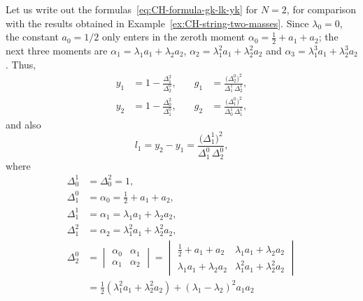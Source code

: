 \documentclass[10pt,a4paper]{article} \pdfoutput=1 
\begin{document}
\begin{example}
  \label{ex:CH-string-two-masses-cont}
  Let us write out the formulas~\eqref{eq:CH-formula-gk-lk-yk} for $N=2$,
  for comparison with the results
  obtained in Example~\ref{ex:CH-string-two-masses}.
  Since $\lambda_0=0$, the constant $a_0=1/2$ only enters in the zeroth moment
  $\alpha_0 = \tfrac12 + a_1 + a_2$;
  the next three moments are
  $\alpha_1 = \lambda_1 a_1 + \lambda_2 a_2$,
  $\alpha_2 = \lambda_1^2 a_1 + \lambda_2^2 a_2$
  and
  $\alpha_3 = \lambda_1^3 a_1 + \lambda_2^3 a_2$.
  Thus,
  \begin{equation}
    \begin{aligned}
      y_1 &= 1 - \frac{\Delta_{1}^2}{\Delta_{2}^0}
      ,\quad &
      g_1 &= \frac{\bigl( \Delta_{2}^0 \bigr)^2}{\Delta_{1}^1 \, \Delta_{2}^1}
      ,\\
      y_2 &= 1 - \frac{\Delta_{0}^2}{\Delta_{1}^0}
      ,&
      g_2 &= \frac{\bigl( \Delta_{1}^0 \bigr)^2}{\Delta_{0}^1 \, \Delta_{1}^1}
      ,
    \end{aligned}
  \end{equation}
  and also
  \begin{equation}
    l_1 = y_2 - y_1
    = \frac{\bigl( \Delta_{1}^1 \bigr)^2}{\Delta_{1}^0 \, \Delta_{2}^0}
    ,
  \end{equation}
  where
  \begin{equation}
    \label{eq:CH-string-two-masses-determinants}
    \begin{aligned}
      \Delta_0^1 &= \Delta_0^2 = 1
      ,\\
      \Delta_1^0 & = \alpha_0 = \tfrac12 + a_1 + a_2
      ,\\
      \Delta_1^1 & = \alpha_1 = \lambda_1 a_1 + \lambda_2 a_2
      ,\\
      \Delta_1^2 & = \alpha_2 = \lambda_1^2 a_1 + \lambda_2^2 a_2
      ,\\
      \Delta_2^0 & =
      \begin{vmatrix} \alpha_0 & \alpha_1 \\ \alpha_1 & \alpha_2 \end{vmatrix}
      = \begin{vmatrix}
        \tfrac12 + a_1 + a_2 & \lambda_1 a_1 + \lambda_2 a_2 \\
        \lambda_1 a_1 + \lambda_2 a_2 & \lambda_1^2 a_1 + \lambda_2^2 a_2
      \end{vmatrix}
      \\ &
      = \tfrac12 (\lambda_1^2 a_1 + \lambda_2^2 a_2) + (\lambda_1 - \lambda_2)^2 a_1 a_2

\end{aligned}
\end{equation}
\end{example}
\end{document}
